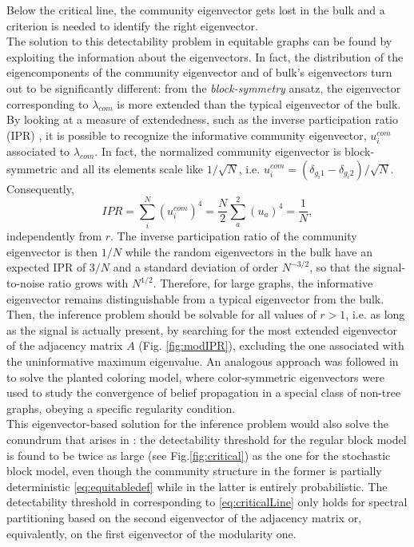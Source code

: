 \documentclass[%
 reprint,
 amsmath,amssymb,
 aps,
 pre,
 showpacs
]{revtex4-1}
\begin{document}
Below the critical line, the community eigenvector gets lost in the bulk and a criterion is needed to identify the right eigenvector. \\
The solution to this detectability problem in equitable graphs can be found by exploiting the information about the eigenvectors. In fact, the distribution of the eigencomponents of the community eigenvector and of bulk's eigenvectors turn out to be significantly different: from the \textit{block-symmetry} ansatz, the eigenvector corresponding to $\lambda_{com}$ is more extended than the typical eigenvector of the bulk. \\
By looking at a measure of extendedness, such as the inverse participation ratio (IPR) \cite{coja2009spectral,kawamoto2015limitations}, it is possible to recognize the informative community eigenvector, $u_i^{com}$ associated to $\lambda_{com}$. In fact, the normalized community eigenvector is block-symmetric and all its elements scale like $1/\sqrt{N}$, i.e. $u_i^{com} = (\delta_{g_i1}-\delta_{g_i2})/\sqrt{N}$. Consequently,
\begin{equation}\label{eq:IPR}
IPR = \sum_{i}^N\left(u_i^{com}\right)^4 = \frac{N}{2}\sum_{a}^2\left(u_a\right)^4 = \frac{1}{N},
\end{equation}
independently from $r$. The inverse participation ratio of the community eigenvector is then $1/N$ while the random eigenvectors in the bulk have an expected IPR of $3/N$ \cite{dumitriu2012sparse} and a standard deviation of order $N^{-3/2}$, so that the signal-to-noise ratio grows with $N^{1/2}$. Therefore, for large graphs, the informative eigenvector remains distinguishable from a typical eigenvector from the bulk.\\
Then, the inference problem should be solvable for all values of $r>1$, i.e. as long as the signal is actually present, by searching for the most extended eigenvector of the adjacency matrix $A$ (Fig. \ref{fig:modIPR}), excluding the one associated with the uninformative maximum eigenvalue. An analogous approach was followed in \cite{coja2009spectral} to solve the planted coloring model, where color-symmetric eigenvectors were used to study the convergence of belief propagation in a special class of non-tree graphs, obeying a specific regularity condition. \\
This eigenvector-based solution for the inference problem would also solve the conundrum that arises in \cite{radicchi2013detectability}: the detectability threshold for the regular block model is found to be twice as large (see Fig.\ref{fig:critical}) as the one for the stochastic block model, even though the community structure in the former is partially deterministic \eqref{eq:equitabledef} while in the latter is entirely probabilistic. The detectability threshold in \cite{radicchi2013detectability} corresponding to \eqref{eq:criticalLine} only holds for spectral partitioning based on the second eigenvector of the adjacency matrix or, equivalently, on the first eigenvector of the modularity one. \\
\end{document}

